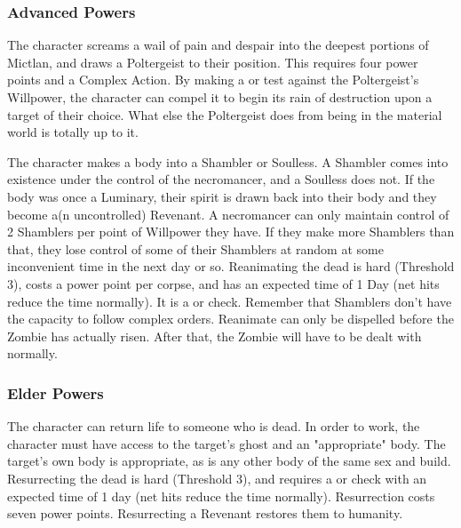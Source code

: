 \subsubsection{Advanced Powers}

 The character screams a wail of pain and despair into the deepest portions of Mictlan, and draws a Poltergeist to their position. This requires four power points and a Complex Action. By making a  or  test against the Poltergeist's Willpower, the character can compel it to begin its rain of destruction upon a target of their choice. What else the Poltergeist does from being in the material world is totally up to it.

 The character makes a body into a Shambler or Soulless. A Shambler comes into existence under the control of the necromancer, and a Soulless does not. If the body was once a Luminary, their spirit is drawn back into their body and they become a(n uncontrolled) Revenant. A necromancer can only maintain control of 2 Shamblers per point of Willpower they have. If they make more Shamblers than that, they lose control of some of their Shamblers at random at some inconvenient time in the next day or so. Reanimating the dead is hard (Threshold 3), costs a power point per corpse, and has an expected time of 1 Day (net hits reduce the time normally). It is a  or  check. Remember that Shamblers don't have the capacity to follow complex orders. Reanimate can only be dispelled before the Zombie has actually risen. After that, the Zombie will have to be dealt with normally.

\subsubsection{Elder Powers}

 The character can return life to someone who is dead. In order to work, the character must have access to the target's ghost and an "appropriate" body. The target's own body is appropriate, as is any other body of the same sex and build. Resurrecting the dead is hard (Threshold 3), and requires a  or  check with an expected time of 1 day (net hits reduce the time normally). Resurrection costs seven power points. Resurrecting a Revenant restores them to humanity.

